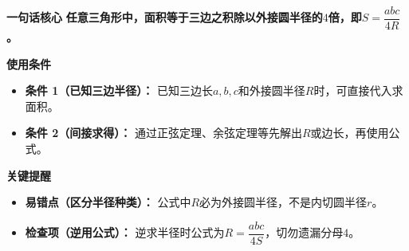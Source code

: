 \begin{summarybox}
	\textbf{\textcolor{CSummary}{一句话核心}}
	\textbf{任意三角形中，面积等于三边之积除以外接圆半径的$4$倍，即$S=\dfrac{abc}{4R}$。}

	\medskip
	\textbf{\textcolor{CSummary}{使用条件}}
	\begin{itemize}[leftmargin=*, itemsep=0.5em, topsep=0.4em]
		\item \textbf{条件 1（已知三边半径）：} 已知三边长$a,b,c$和外接圆半径$R$时，可直接代入求面积。
		\item \textbf{条件 2（间接求得）：} 通过正弦定理、余弦定理等先解出$R$或边长，再使用公式。
	\end{itemize}

	\medskip
	\textbf{\textcolor{CSummary}{关键提醒}}
	\begin{itemize}[leftmargin=*, itemsep=0.5em, topsep=0.4em]
		\item \textbf{易错点（区分半径种类）：} 公式中$R$必为外接圆半径，不是内切圆半径$r$。
		\item \textbf{检查项（逆用公式）：} 逆求半径时公式为$R=\dfrac{abc}{4S}$，切勿遗漏分母$4$。
	\end{itemize}
\end{summarybox}
